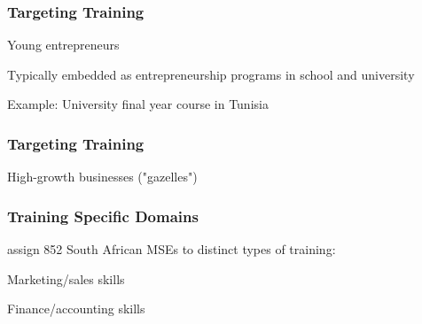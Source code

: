 \documentclass[hideothersubsections, usenames,dvipsnames,11pt]{beamer}
\newenvironment{itemize_2pt}{\itemize\addtolength{\itemsep}{2pt}}{\enditemize}
\newenvironment{enumerate_2pt}{\enumerate\addtolength{\itemsep}{2pt}}{\endenumerate}
\begin{document}
\begin{frame}
\frametitle{Targeting Training}
	Young entrepreneurs
	\begin{itemize_2pt}
		\item Typically embedded as entrepreneurship programs in school and university
		\item Example: University final year course in Tunisia \citep{Alaref2020}
		\begin{itemize_2pt}
			\item
			\item
		\end{itemize_2pt}
	\end{itemize_2pt}
\end{frame}

\begin{frame}
\frametitle{Targeting Training}
	High-growth businesses ("gazelles")
	\begin{itemize_2pt}
	\item
	\item
	\vspace{0.1in}
	\end{itemize_2pt}
\end{frame}


\begin{frame}
\frametitle{Training Specific Domains}

	\citet{Anderson2018} assign 852 South African MSEs to distinct types of training:
	\begin{enumerate_2pt}
		\item Marketing/sales skills
		\item[]
		\item[]
		\item Finance/accounting skills
		\item[]
		\item[]
	\end{enumerate_2pt}


\end{frame}
\end{document}
